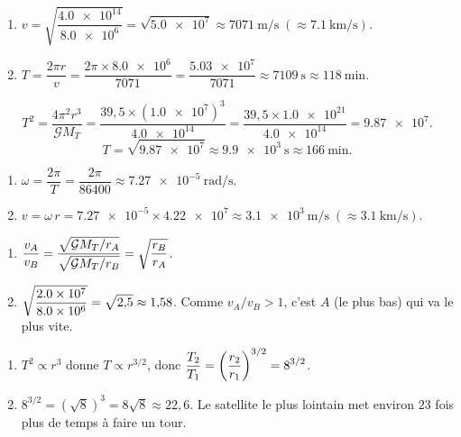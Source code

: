 \documentclass[11pt,a4paper]{article}
\begin{document}

\begin{corrige}
\begin{enumerate}[label=\alph*)]
  \item $v=\sqrt{\dfrac{\num{4.0e14}}{\num{8.0e6}}}=\sqrt{\num{5.0e7}}
        \approx\qty{7071}{\metre\per\second}\;(\approx\qty{7.1}{\kilo\metre\per\second})$.
  \item $T=\dfrac{2\pi r}{v}=\dfrac{2\pi\times\num{8.0e6}}{7071}
        =\dfrac{\num{5.03e7}}{7071}\approx\qty{7109}{\second}\approx\qty{118}{\minute}$.
\end{enumerate}
\end{corrige}

\begin{corrige}
\[
T^2=\frac{4\pi^2 r^3}{\mathcal{G}M_T}
   =\frac{39{,}5\times(\num{1.0e7})^3}{\num{4.0e14}}
   =\frac{39{,}5\times\num{1.0e21}}{\num{4.0e14}}=\num{9.87e7}.
\]
\[
T=\sqrt{\num{9.87e7}}\approx\qty{9.9e3}{\second}\approx\qty{166}{\minute}.
\]
\end{corrige}

\begin{corrige}
\begin{enumerate}[label=\alph*)]
  \item $\omega=\dfrac{2\pi}{T}=\dfrac{2\pi}{86400}\approx\qty{7.27e-5}{\radian\per\second}$.
  \item $v=\omega\,r=\num{7.27e-5}\times\num{4.22e7}\approx\qty{3.1e3}{\metre\per\second}
        \;(\approx\qty{3.1}{\kilo\metre\per\second})$.
\end{enumerate}
\end{corrige}

\begin{corrige}
\begin{enumerate}[label=\alph*)]
  \item $\displaystyle \frac{v_A}{v_B}=\frac{\sqrt{\mathcal{G}M_T/r_A}}{\sqrt{\mathcal{G}M_T/r_B}}
        =\sqrt{\frac{r_B}{r_A}}$.
  \item $\displaystyle \sqrt{\frac{\num{2.0e7}}{\num{8.0e6}}}=\sqrt{2{,}5}\approx 1{,}58$.
        Comme $v_A/v_B>1$, c'est $A$ (le plus bas) qui va le plus vite.
\end{enumerate}
\end{corrige}

\begin{corrige}
\begin{enumerate}[label=\alph*)]
  \item $T^2\propto r^3$ donne $T\propto r^{3/2}$, donc
        $\displaystyle \frac{T_2}{T_1}=\left(\frac{r_2}{r_1}\right)^{3/2}=8^{3/2}$.
  \item $8^{3/2}=(\sqrt{8})^3=8\sqrt{8}\approx 22{,}6$. Le satellite le plus lointain met
        environ $23$ fois plus de temps à faire un tour.
\end{enumerate}
\end{corrige}
\end{document}
